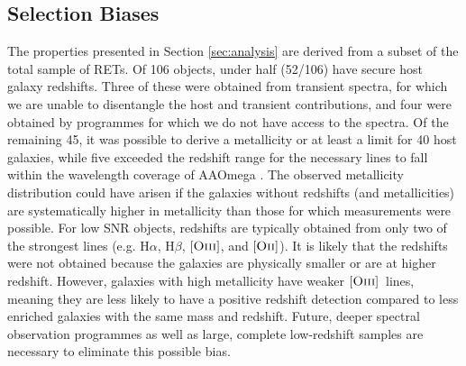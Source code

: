 \documentclass[fleqn,usenatbib,]{mnras}
\newcommand{\replylluis}[1]{\color{brown}#1 \color{black}}
\newcommand{\halpha}[0]{H$\alpha$}
\newcommand{\hbeta}[0]{H$\beta$}
\newcommand{\OII}[0]{$[\textnormal{\textsc{Oii}}]$}
\newcommand{\OIII}[0]{$[\textnormal{\textsc{Oiii}}]$}
\begin{document}
\subsection{Selection Biases \label{subsec:disc_bias}}
The properties presented in Section \ref{sec:analysis} are derived from a subset of the total sample of RETs. Of 106 objects, under half \replylluis{(52/106)} have secure host galaxy redshifts. Three of these were obtained from transient spectra, for which we are unable to disentangle the host and transient contributions, and four were obtained by programmes for which we do not have access to the spectra. Of the remaining 45, it was possible to derive a metallicity \replylluis{or at least a limit} for 40 host galaxies, \replylluis{while five exceeded the redshift range for the necessary lines to fall within the wavelength coverage of AAOmega}. The observed metallicity distribution could have arisen if the galaxies without redshifts (and metallicities) are systematically higher in metallicity than those for which measurements were possible. For low SNR objects, redshifts are typically obtained from only two of the strongest lines (e.g. \halpha, \hbeta, \OIII, and \OII). \replylluis{It is likely that the redshifts were not obtained because the galaxies are physically smaller or are at higher redshift. However, galaxies with high metallicity have weaker \OIII~lines, meaning they are less likely to have a positive redshift detection compared to less enriched galaxies with the same mass and redshift. Future, deeper spectral observation programmes as well as large, complete low-redshift samples are necessary to eliminate this possible bias.}
\end{document}
